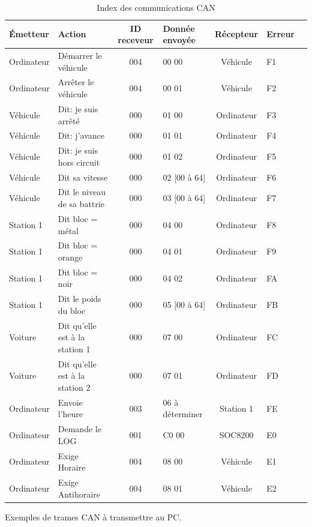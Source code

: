 \documentclass[10pt,a4paper,final]{article}
\begin{document}
\begin{spacing}{1.5}
\begin{table}[!ht]
\caption{Index des communications CAN}
\medskip
\centering
\begin{tabular}{|l|l|c|l|c|l|c|}
\hline 
\textbf{Émetteur} & \textbf{Action} & \textbf{ID receveur} & \textbf{Donnée envoyée} & \textbf{Récepteur} & \textbf{Erreur}\\ 
\hline 
Ordinateur & Démarrer le véhicule & 004 & 00 00  & Véhicule &  F1\\ 
\hline 
Ordinateur & Arrêter le véhicule & 004 & 00 01  & Véhicule &  F2\\ 
\hline 
Véhicule & Dit: je suis arrêté & 000 & 01 00   & Ordinateur &  F3\\
\hline 
Véhicule & Dit: j'avance & 000 & 01 01  & Ordinateur  &  F4\\  
\hline 
Véhicule & Dit: je suis hors circuit & 000 & 01 02  & Ordinateur &  F5\\ 
\hline 
Véhicule & Dit sa vitesse & 000 & 02 [00 à 64]  & Ordinateur &  F6\\ 
\hline 
Véhicule & Dit le niveau de sa battrie & 000 & 03 [00 à 64]  & Ordinateur &  F7\\ 
\hline 
Station 1 & Dit bloc = métal & 000 & 04 00  & Ordinateur &  F8\\ 
\hline  
Station 1 & Dit bloc = orange & 000 & 04 01  & Ordinateur &  F9\\
\hline 
Station 1 & Dit bloc = noir & 000 & 04 02  & Ordinateur &  FA\\
\hline 
Station 1 & Dit le poids du bloc & 000 & 05 [00 à 64]  & Ordinateur &  FB\\ 
\hline 
Voiture & Dit qu'elle est à la station 1 & 000 & 07 00  & Ordinateur &  FC\\ 
\hline 
Voiture & Dit qu'elle est à la station 2 & 000 & 07 01  & Ordinateur &  FD\\
\hline 
Ordinateur & Envoie l'heure & 003 & 06 à déterminer  & Station 1 &  FE\\ 
\hline 
Ordinateur & Demande le LOG & 001 & C0 00  & SOC8200 & E0\\ 
\hline
Ordinateur & Exige Horaire & 004 & 08 00  & Véhicule & E1\\ 
\hline
Ordinateur & Exige Antihoraire & 004 & 08 01  & Véhicule & E2\\ 
\hline
\end{tabular} 
\label{tab:testtab1}
\end{table}

\pagebreak
\begin{flushleft}
 Exemples de trames CAN à transmettre au PC.
 \end{flushleft} 
\end{spacing}
\end{document}
